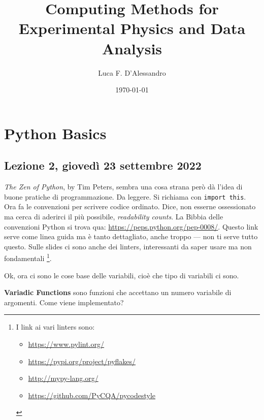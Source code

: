 \documentclass[10pt, a4paper, titlepage]{book}
\title{Computing Methods for Experimental Physics and Data Analysis}
\author{Luca F. D'Alessandro}
\date{\today}
\begin{document}
\maketitle

\tableofcontents


\chapter{Python Basics}

\section{Lezione 2, giovedì 23 settembre 2022}

\emph{The Zen of Python}, by Tim Peters, sembra una cosa strana però dà l'idea di buone pratiche di programmazione. Da leggere. Si richiama con \texttt{import this}.
Ora fa le convenzioni per scrivere codice ordinato. Dice, non esserne ossessionato ma cerca di aderirci il più possibile, \textit{readability counts}.
La Bibbia delle convenzioni Python si trova qua: \url{https://peps.python.org/pep-0008/}. 
Questo link serve come linea guida ma è tanto dettagliato, anche troppo --- non ti serve tutto questo.
Sulle slides ci sono anche dei linters, interessanti da saper usare ma non fondamentali
\footnote{
I link ai vari linters sono: 
	\begin{itemize}
		\item \url{https://www.pylint.org/}
		\item \url{https://pypi.org/project/pyflakes/}
		\item \url{http://mypy-lang.org/}
		\item \url{https://github.com/PyCQA/pycodestyle}
	\end{itemize}
}.


Ok, ora ci sono le cose base delle variabili, cioè che tipo di variabili ci sono.

\textbf{Variadic Functions} sono funzioni che accettano un numero variabile di argomenti. Come viene implementato?
\end{document}
